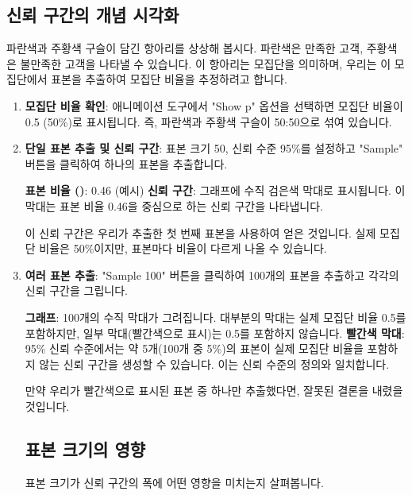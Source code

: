 \documentclass[11pt,a4paper]{article}
\begin{document}
\subsection{신뢰 구간의 개념 시각화}
파란색과 주황색 구슬이 담긴 항아리를 상상해 봅시다. 파란색은 만족한 고객, 주황색은 불만족한 고객을 나타낼 수 있습니다. 이 항아리는 모집단을 의미하며, 우리는 이 모집단에서 표본을 추출하여 모집단 비율을 추정하려고 합니다.

\begin{enumerate}
    \item \textbf{모집단 비율 확인}:
    애니메이션 도구에서 "Show p" 옵션을 선택하면 모집단 비율이 0.5 (50\%)로 표시됩니다. 즉, 파란색과 주황색 구슬이 50:50으로 섞여 있습니다.

    \item \textbf{단일 표본 추출 및 신뢰 구간}:
    표본 크기 50, 신뢰 수준 95\%를 설정하고 "Sample" 버튼을 클릭하여 하나의 표본을 추출합니다.
    \begin{tcolorbox}[title=단일 표본 결과, mybox]
        \textbf{표본 비율 ()}: 0.46 (예시)
        \textbf{신뢰 구간}: 그래프에 수직 검은색 막대로 표시됩니다. 이 막대는 표본 비율 0.46을 중심으로 하는 신뢰 구간을 나타냅니다.
    \end{tcolorbox}
    이 신뢰 구간은 우리가 추출한 첫 번째 표본을 사용하여 얻은 것입니다. 실제 모집단 비율은 50\%이지만, 표본마다 비율이 다르게 나올 수 있습니다.

    \item \textbf{여러 표본 추출}:
    "Sample 100" 버튼을 클릭하여 100개의 표본을 추출하고 각각의 신뢰 구간을 그립니다.
    \begin{tcolorbox}[title=100개 표본 결과, mybox]
        \textbf{그래프}: 100개의 수직 막대가 그려집니다. 대부분의 막대는 실제 모집단 비율 0.5를 포함하지만, 일부 막대(빨간색으로 표시)는 0.5를 포함하지 않습니다.
        \textbf{빨간색 막대}: 95\% 신뢰 수준에서는 약 5개(100개 중 5\%)의 표본이 실제 모집단 비율을 포함하지 않는 신뢰 구간을 생성할 수 있습니다. 이는 신뢰 수준의 정의와 일치합니다.
    \end{tcolorbox}
    만약 우리가 빨간색으로 표시된 표본 중 하나만 추출했다면, 잘못된 결론을 내렸을 것입니다.

\subsection{표본 크기의 영향}
표본 크기가 신뢰 구간의 폭에 어떤 영향을 미치는지 살펴봅니다.


\end{enumerate}
\end{document}
